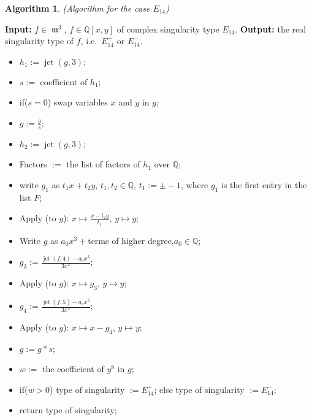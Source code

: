 \documentclass{amsproc}
\DeclareMathOperator{\m}{\mathfrak{m}}
\DeclareMathOperator{\jt}{jet}
\begin{document}
\newtheorem{E[14]}[kjet]{Algorithm}
\begin{E[14]}(Algorithm for the case $E_{14}$)\label{E[14]}
\end{E[14]}
\noindent\textnormal{\bf Input:} $f\in \m^3$, $f\in\mathbb Q[x,y]$ of complex singularity type $E_{14}$.\newline
\textnormal{\bf Output:} the real singularity type of $f$, i.e.~$E_{14}^+$ or $E_{14}^-$.
\begin{itemize}
\item $h_1 :=\jt(g,3);$
\item $s :=$ coefficient of $h_1$;
\item if($s=0$)\newline
\phantom{}\quad swap variables $x$ and $y$ in $g$;
\item $g := \frac{g}{s}$;
\item $h_2 :=\jt(g,3)$;
\item Factors $:=$ the list of factors of $h_1$ over $\mathbb Q$;
\item write $g_1$ as $t_1x+t_2y$, $t_1,t_2\in\mathbb Q$, $t_1 := \pm-1$, where $g_1$ is the first entry in the list $F$;
\item Apply (to $g$): $x\mapsto \frac{x-t_2y}{t_1}$, $y\mapsto y$;
\item Write $g$ as $a_0x^3+ $terms of higher degree,\quad$a_0\in\mathbb Q$;
\item $g_3:=\frac{\jt(f,4)-a_0x^3}{3x^2}$;
\item Apply (to $g$): $x\mapsto g_3$, $y\mapsto y$;
\item $g_4:=\frac{\jt(f,5)-a_0x^3}{3x^2}$;
\item Apply (to $g$): $x\mapsto x-g_4$, $y\mapsto y$;
\item $g := g*s$;
\item $w:=$ the coefficient of $y^8$ in $g$;
\item if($w>0$)\newline
\phantom{}\quad type of singularity $:= E_{14}^+$;\newline
 else\newline
\phantom{}\quad type of singularity $:= E_{14}^-$;
\item return type of singularity;
\end{itemize}
\end{document}
